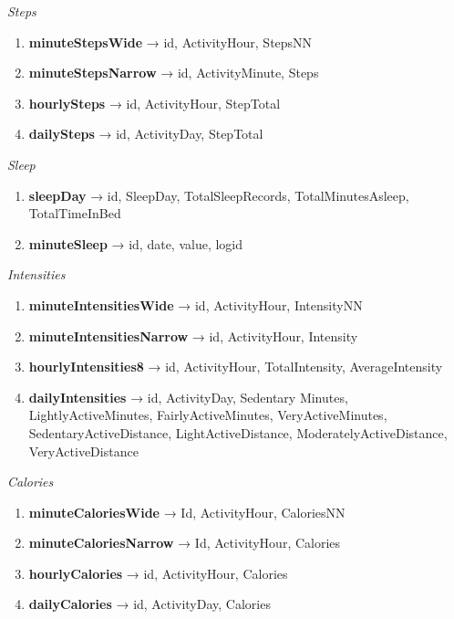 \documentclass[
]{article}
\providecommand{\tightlist}{%
  \setlength{\itemsep}{0pt}\setlength{\parskip}{0pt}}
\begin{document}
\emph{{Steps}}

\begin{enumerate}
\def\labelenumi{\arabic{enumi}.}
\setcounter{enumi}{2}
\tightlist
\item
  \textbf{minuteStepsWide} → id, ActivityHour, StepsNN
\item
  \textbf{minuteStepsNarrow} → id, ActivityMinute, Steps
\item
  \textbf{hourlySteps} → id, ActivityHour, StepTotal
\item
  \textbf{dailySteps} → id, ActivityDay, StepTotal
\end{enumerate}

\emph{{Sleep}}

\begin{enumerate}
\def\labelenumi{\arabic{enumi}.}
\setcounter{enumi}{6}
\tightlist
\item
  \textbf{sleepDay} → id, SleepDay, TotalSleepRecords,
  TotalMinutesAsleep, TotalTimeInBed
\item
  \textbf{minuteSleep} → id, date, value, logid
\end{enumerate}

\emph{{Intensities}}

\begin{enumerate}
\def\labelenumi{\arabic{enumi}.}
\setcounter{enumi}{8}
\tightlist
\item
  \textbf{minuteIntensitiesWide} → id, ActivityHour, IntensityNN
\item
  \textbf{minuteIntensitiesNarrow} → id, ActivityHour, Intensity
\item
  \textbf{hourlyIntensities8} → id, ActivityHour, TotalIntensity,
  AverageIntensity
\item
  \textbf{dailyIntensities} → id, ActivityDay, Sedentary Minutes,
  LightlyActiveMinutes, FairlyActiveMinutes, VeryActiveMinutes,
  SedentaryActiveDistance, LightActiveDistance,
  ModeratelyActiveDistance, VeryActiveDistance
\end{enumerate}

\emph{{Calories}}

\begin{enumerate}
\def\labelenumi{\arabic{enumi}.}
\setcounter{enumi}{12}
\tightlist
\item
  \textbf{minuteCaloriesWide} → Id, ActivityHour, CaloriesNN
\item
  \textbf{minuteCaloriesNarrow} → Id, ActivityHour, Calories
\item
  \textbf{hourlyCalories} → id, ActivityHour, Calories
\item
  \textbf{dailyCalories} → id, ActivityDay, Calories
\end{enumerate}
\end{document}
